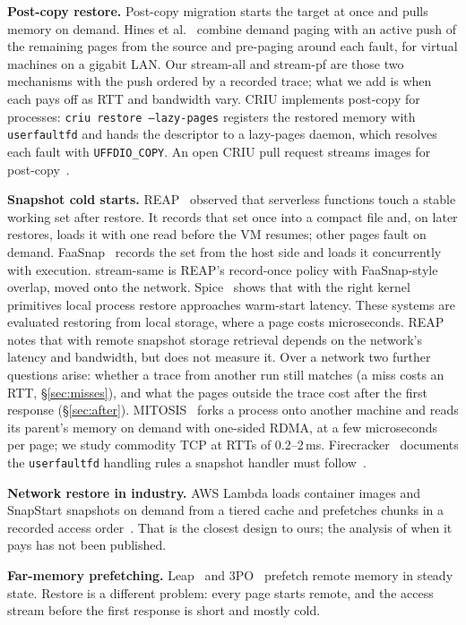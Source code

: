 \documentclass[conference]{IEEEtran}
\newcommand{\uffd}{\texttt{userfaultfd}\xspace}
\newcommand{\mode}[1]{\textsf{#1}}
\begin{document}
\textbf{Post-copy restore.} Post-copy migration starts the target at once and
pulls memory on demand. Hines et al.~\cite{hines2009postcopy} combine demand
paging with an active push of the remaining pages from the source and
pre-paging around each fault, for virtual machines on a gigabit LAN. Our
\mode{stream-all} and \mode{stream-pf} are those two mechanisms with the
push ordered by a recorded trace; what we add is when each pays off as RTT
and bandwidth vary. CRIU implements
post-copy for processes: \texttt{criu restore --lazy-pages} registers the
restored memory with \uffd and hands the descriptor to a lazy-pages daemon,
which resolves each fault with \texttt{UFFDIO\_COPY}. An open CRIU pull
request streams images for post-copy~\cite{criu-stream-pr}.

\textbf{Snapshot cold starts.} REAP~\cite{ustiugov2021reap} observed that
serverless functions touch a stable working set after restore. It records
that set once into a compact file and, on later restores, loads it with one
read before the VM resumes; other pages fault on demand.
FaaSnap~\cite{ao2022faasnap} records the set from the host side and loads it
concurrently with execution. \mode{stream-same} is REAP's record-once policy
with FaaSnap-style overlap, moved onto the network. Spice~\cite{holmes2025spice}
shows that with the right kernel primitives local process restore approaches
warm-start latency. These systems are evaluated restoring from local storage,
where a page costs microseconds. REAP notes that with remote snapshot storage
retrieval depends on the network's latency and bandwidth, but does not
measure it. Over a network two further questions arise: whether a trace from
another run still matches (a miss costs an RTT, \S\ref{sec:misses}), and what
the pages outside the trace cost after the first response (\S\ref{sec:after}).
MITOSIS~\cite{wei2023mitosis} forks a process onto another machine and reads
its parent's memory on demand with one-sided RDMA, at a few microseconds per
page; we study commodity TCP at RTTs of 0.2--2\,ms.
Firecracker~\cite{agache2020firecracker} documents the \uffd handling rules a
snapshot handler must follow~\cite{firecracker-uffd}.

\textbf{Network restore in industry.} AWS Lambda loads container images and
SnapStart snapshots on demand from a tiered cache and prefetches chunks in a
recorded access order~\cite{brooker2023ondemand, snapstart}. That is the
closest design to ours; the analysis of when it pays has not been published.

\textbf{Far-memory prefetching.} Leap~\cite{maruf2020leap} and
3PO~\cite{branner2022threepo} prefetch remote memory in steady state. Restore
is a different problem: every page starts remote, and the access stream before
the first response is short and mostly cold.
\end{document}
